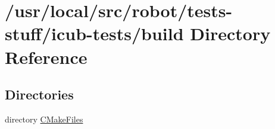 \section{/usr/local/src/robot/tests-\/stuff/icub-\/tests/build Directory Reference}
\label{dir_f6877060a2265c795ff1e63e78220d59}
\subsection*{Directories}
\begin{DoxyCompactItemize}
\item 
directory \hyperlink{dir_b673233928467334ffecfef07ea67227}{C\-Make\-Files}
\end{DoxyCompactItemize}

